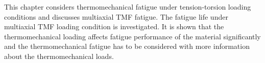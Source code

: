 
\noindent
This chapter considers thermomechanical fatigue under tension-torsion loading conditions and discusses multiaxial TMF fatigue. The fatigue life under multiaxial TMF loading condition is investigated. It is shown that the thermomechanical loading affects fatigue performance of the material significantly and the thermomechanical fatigue has to be considered with more information about the thermomechanical loads.
